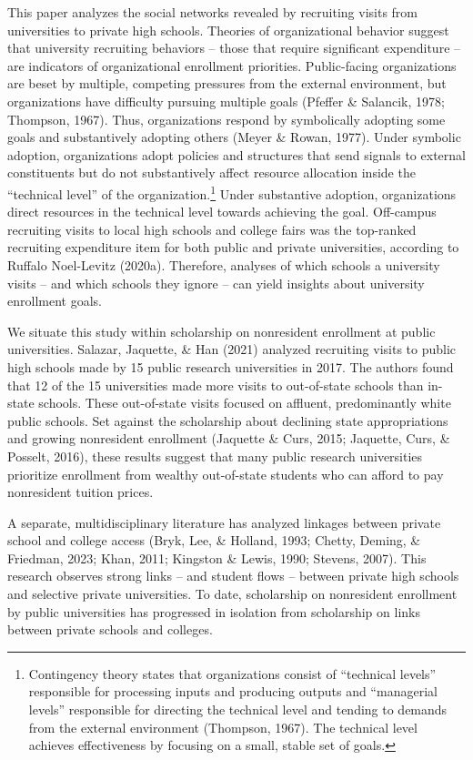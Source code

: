 \documentclass[
  12pt,
]{article}
\begin{document}
This paper analyzes the social networks revealed by recruiting visits from universities to private high schools. Theories of organizational behavior suggest that university recruiting behaviors -- those that require significant expenditure -- are indicators of organizational enrollment priorities. Public-facing organizations are beset by multiple, competing pressures from the external environment, but organizations have difficulty pursuing multiple goals (Pfeffer \& Salancik, 1978; Thompson, 1967). Thus, organizations respond by symbolically adopting some goals and substantively adopting others (Meyer \& Rowan, 1977). Under symbolic adoption, organizations adopt policies and structures that send signals to external constituents but do not substantively affect resource allocation inside the ``technical level'' of the organization.\footnote{Contingency theory states that organizations consist of ``technical levels'' responsible for processing inputs and producing outputs and ``managerial levels'' responsible for directing the technical level and tending to demands from the external environment (Thompson, 1967). The technical level achieves effectiveness by focusing on a small, stable set of goals.} Under substantive adoption, organizations direct resources in the technical level towards achieving the goal. Off-campus recruiting visits to local high schools and college fairs was the top-ranked recruiting expenditure item for both public and private universities, according to Ruffalo Noel-Levitz (2020a). Therefore, analyses of which schools a university visits -- and which schools they ignore -- can yield insights about university enrollment goals.

We situate this study within scholarship on nonresident enrollment at public universities. Salazar, Jaquette, \& Han (2021) analyzed recruiting visits to public high schools made by 15 public research universities in 2017. The authors found that 12 of the 15 universities made more visits to out-of-state schools than in-state schools. These out-of-state visits focused on affluent, predominantly white public schools. Set against the scholarship about declining state appropriations and growing nonresident enrollment (Jaquette \& Curs, 2015; Jaquette, Curs, \& Posselt, 2016), these results suggest that many public research universities prioritize enrollment from wealthy out-of-state students who can afford to pay nonresident tuition prices.

A separate, multidisciplinary literature has analyzed linkages between private school and college access (Bryk, Lee, \& Holland, 1993; Chetty, Deming, \& Friedman, 2023; Khan, 2011; Kingston \& Lewis, 1990; Stevens, 2007). This research observes strong links -- and student flows -- between private high schools and selective private universities. To date, scholarship on nonresident enrollment by public universities has progressed in isolation from scholarship on links between private schools and colleges.
\end{document}
